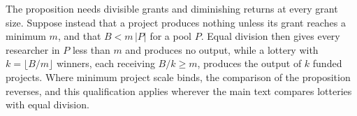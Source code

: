 \begin{remark}
The proposition needs divisible grants and diminishing returns at every grant size. Suppose instead that a project produces nothing unless its grant reaches a minimum $m$, and that $B < m\,|P|$ for a pool $P$. Equal division then gives every researcher in $P$ less than $m$ and produces no output, while a lottery with $k = \lfloor B/m \rfloor$ winners, each receiving $B/k \geq m$, produces the output of $k$ funded projects. Where minimum project scale binds, the comparison of the proposition reverses, and this qualification applies wherever the main text compares lotteries with equal division.
\end{remark}

